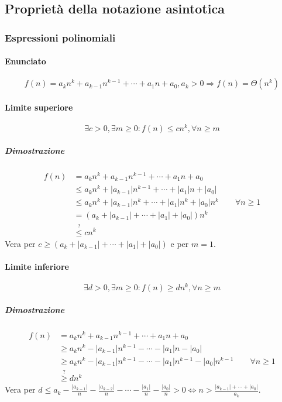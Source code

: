 \subsection{Propriet\`a della notazione asintotica}
\subsubsection{Espressioni polinomiali}
\paragraph{Enunciato}
\begin{equation*}
f(n)=a_kn^k+a_{k-1}n^{k-1}+\cdots+a_1n+a_0, a_k>0\Rightarrow f(n)=\Theta(n^k)
\end{equation*}
\paragraph{Limite superiore}
\begin{equation*}
\exists c>0, \exists m\ge 0:f(n)\le cn^k,\forall n\ge m
\end{equation*}
\subparagraph{Dimostrazione}
\begin{align*}
f(n)&=a_kn^k+a_{k-1}n^{k-1}+\cdots+a_1n+a_0\\
&\le a_kn^k+|a_{k-1}|n^{k-1}+\cdots+|a_1|n+|a_0|\\
&\le a_kn^k+|a_{k-1}|n^k+\cdots+|a_1|n^k+|a_0|n^k\quad\quad\forall n\ge 1\\
&= (a_k+|a_{k-1}|+\cdots+|a_1|+|a_0|)n^k\\
&\overset{?}{\le} cn^k
\end{align*}
Vera per $c\ge (a_k+|a_{k-1}|+\cdots+|a_1|+|a_0|)$ e per $m=1$.
\paragraph{Limite inferiore}
\begin{equation*}
\exists d>0, \exists m\ge 0:f(n)\ge dn^k,\forall n\ge m
\end{equation*}
\subparagraph{Dimostrazione}
\begin{align*}
f(n)&=a_kn^k+a_{k-1}n^{k-1}+\cdots+a_1n+a_0\\
&\ge a_kn^k-|a_{k-1}|n^{k-1}-\cdots-|a_1|n-|a_0|\\
&\ge a_kn^k-|a_{k-1}|n^{k-1}-\cdots-|a_1|n^{k-1}-|a_0|n^{k-1}\quad\quad\forall n\ge 1\\
&\overset{?}{\ge} dn^k
\end{align*}
Vera per $d\le a_k-\frac{|a_{k-1}|}{n}-\frac{|a_{k-2}|}{n}-\cdots-\frac{|a_{1}|}{n}-\frac{|a_{0}|}{n}>0\Leftrightarrow n>\frac{|a_{k-1}|+\cdots+|a_0|}{a_k}$.
